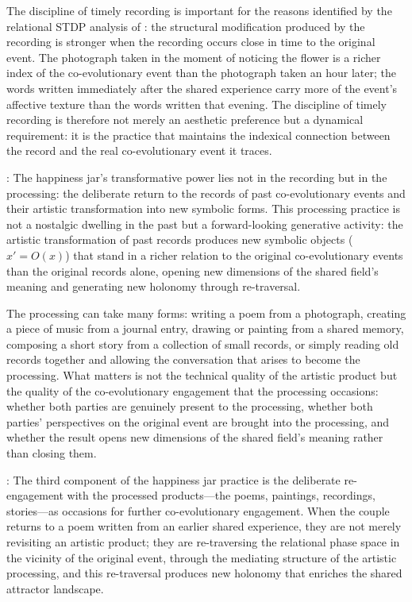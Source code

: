 The discipline of timely recording is important for the reasons identified by the relational STDP analysis of  \parencite{paperxiv}: the structural modification produced by the recording is stronger when the recording occurs close in time to the original event. The photograph taken in the moment of noticing the flower is a richer index of the co-evolutionary event than the photograph taken an hour later; the words written immediately after the shared experience carry more of the event's affective texture than the words written that evening. The discipline of timely recording is therefore not merely an aesthetic preference but a dynamical requirement: it is the practice that maintains the indexical connection between the record and the real co-evolutionary event it traces.

: The happiness jar's transformative power lies not in the recording but in the processing: the deliberate return to the records of past co-evolutionary events and their artistic transformation into new symbolic forms. This processing practice is not a nostalgic dwelling in the past but a forward-looking generative activity: the artistic transformation of past records produces new symbolic objects ($x' = O(x)$) that stand in a richer relation to the original co-evolutionary events than the original records alone, opening new dimensions of the shared field's meaning and generating new holonomy through re-traversal.

The processing can take many forms: writing a poem from a photograph, creating a piece of music from a journal entry, drawing or painting from a shared memory, composing a short story from a collection of small records, or simply reading old records together and allowing the conversation that arises to become the processing. What matters is not the technical quality of the artistic product but the quality of the co-evolutionary engagement that the processing occasions: whether both parties are genuinely present to the processing, whether both parties' perspectives on the original event are brought into the processing, and whether the result opens new dimensions of the shared field's meaning rather than closing them.

: The third component of the happiness jar practice is the deliberate re-engagement with the processed products---the poems, paintings, recordings, stories---as occasions for further co-evolutionary engagement. When the couple returns to a poem written from an earlier shared experience, they are not merely revisiting an artistic product; they are re-traversing the relational phase space in the vicinity of the original event, through the mediating structure of the artistic processing, and this re-traversal produces new holonomy that enriches the shared attractor landscape.


